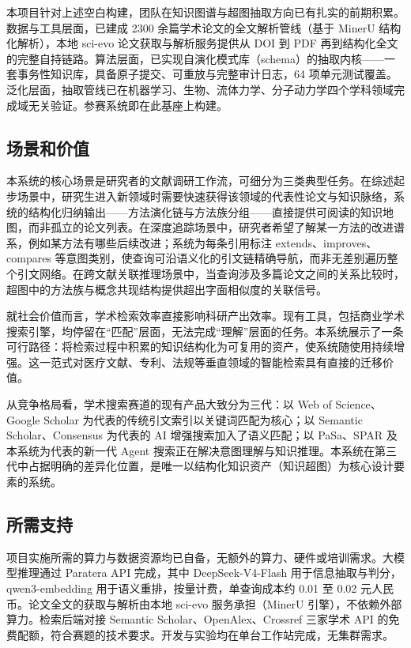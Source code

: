 \documentclass[12pt,a4paper]{ctexart}
\begin{document}
本项目针对上述空白构建，团队在知识图谱与超图抽取方向已有扎实的前期积累。数据与工具层面，已建成 2300 余篇学术论文的全文解析管线（基于 MinerU 结构化解析\cite{mineru}），本地 sci-evo 论文获取与解析服务提供从 DOI 到 PDF 再到结构化全文的完整自持链路。算法层面，已实现自演化模式库（schema）的抽取内核——一套事务性知识库，具备原子提交、可重放与完整审计日志，64 项单元测试覆盖。泛化层面，抽取管线已在机器学习、生物、流体力学、分子动力学四个学科领域完成域无关验证。参赛系统即在此基座上构建。

\subsection{场景和价值}

本系统的核心场景是研究者的文献调研工作流，可细分为三类典型任务。在综述起步场景中，研究生进入新领域时需要快速获得该领域的代表性论文与知识脉络，系统的结构化归纳输出——方法演化链与方法族分组——直接提供可阅读的知识地图，而非孤立的论文列表。在深度追踪场景中，研究者希望了解某一方法的改进谱系，例如某方法有哪些后续改进；系统为每条引用标注 extends、improves、compares 等意图类别，使查询可沿语义化的引文链精确导航，而非无差别遍历整个引文网络。在跨文献关联推理场景中，当查询涉及多篇论文之间的关系比较时，超图中的方法族与概念共现结构提供超出字面相似度的关联信号。

就社会价值而言，学术检索效率直接影响科研产出效率。现有工具，包括商业学术搜索引擎，均停留在“匹配”层面，无法完成“理解”层面的任务。本系统展示了一条可行路径：将检索过程中积累的知识结构化为可复用的资产，使系统随使用持续增强。这一范式对医疗文献、专利、法规等垂直领域的智能检索具有直接的迁移价值。

从竞争格局看，学术搜索赛道的现有产品大致分为三代：以 Web of Science、Google Scholar 为代表的传统引文索引以关键词匹配为核心；以 Semantic Scholar、Consensus 为代表的 AI 增强搜索加入了语义匹配；以 PaSa、SPAR 及本系统为代表的新一代 Agent 搜索正在解决意图理解与知识推理。本系统在第三代中占据明确的差异化位置，是唯一以结构化知识资产（知识超图）为核心设计要素的系统。

\subsection{所需支持}

项目实施所需的算力与数据资源均已自备，无额外的算力、硬件或培训需求。大模型推理通过 Paratera API 完成，其中 DeepSeek-V4-Flash\cite{deepseek} 用于信息抽取与判分，qwen3-embedding\cite{qwen} 用于语义重排，按量计费，单查询成本约 0.01 至 0.02 元人民币。论文全文的获取与解析由本地 sci-evo 服务承担（MinerU 引擎），不依赖外部算力。检索后端对接 Semantic Scholar\cite{s2}、OpenAlex\cite{openalex}、Crossref\cite{crossref} 三家学术 API 的免费配额，符合赛题的技术要求。开发与实验均在单台工作站完成，无集群需求。
\end{document}
